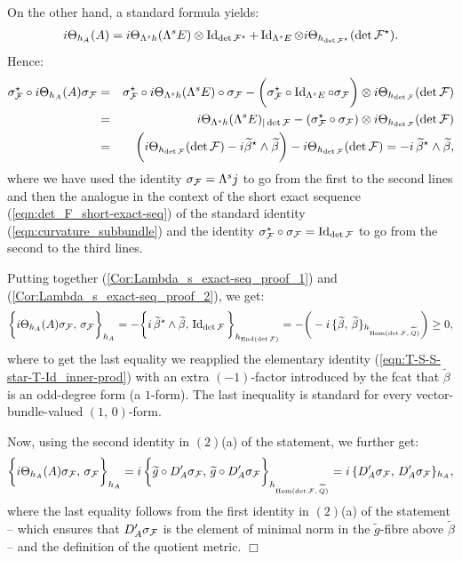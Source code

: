 \documentclass[12pt]{article}
\begin{document}
On the other hand, a standard formula yields: \begin{eqnarray*}i\Theta_{h_A}(A) = i\Theta_{\Lambda^sh}(\Lambda^sE)\otimes\operatorname{Id}_{\det{\cal F}^\star} + \operatorname{Id}_{\Lambda^sE}\otimes i\Theta_{h_{\det{\cal F}^\star}}(\det{\cal F}^\star).\end{eqnarray*} Hence: \begin{eqnarray}\label{Cor:Lambda_s_exact-seq_proof_2}\nonumber\sigma_{\cal F}^\star\circ i\Theta_{h_A}(A)\sigma_{\cal F} & = & \sigma_{\cal F}^\star\circ i\Theta_{\Lambda^sh}(\Lambda^sE)\circ\sigma_{\cal F} - \bigg(\sigma_{\cal F}^\star\circ\operatorname{Id}_{\Lambda^sE}\circ\sigma_{\cal F}\bigg)\otimes i\Theta_{h_{\det{\cal F}}}(\det{\cal F}) \\
\nonumber  & = & i\Theta_{\Lambda^sh}(\Lambda^sE)_{|\det{\cal F}} - (\sigma_{\cal F}^\star\circ\sigma_{\cal F})\otimes i\Theta_{h_{\det{\cal F}}}(\det{\cal F}) \\
& = & \bigg(i\Theta_{h_{\det{\cal F}}}(\det{\cal F}) - i\widetilde\beta^\star\wedge\widetilde\beta\bigg) - i\Theta_{h_{\det{\cal F}}}(\det{\cal F}) = - i\,\widetilde\beta^\star\wedge\widetilde\beta,\end{eqnarray} where we have used the identity $\sigma_{\cal F} = \Lambda^sj$ to go from the first to the second lines and then the analogue in the context of the short exact sequence (\ref{eqn:det_F_short-exact-seq}) of the standard identity (\ref{eqn:curvature_subbundle}) and the identity $\sigma_{\cal F}^\star\circ\sigma_{\cal F} = \operatorname{Id}_{\det\cal F}$ to go from the second to the third lines.

Putting together (\ref{Cor:Lambda_s_exact-seq_proof_1}) and (\ref{Cor:Lambda_s_exact-seq_proof_2}), we get: \begin{eqnarray*}\bigg\{i\Theta_{h_A}(A)\sigma_{\cal F},\,\sigma_{\cal F}\bigg\}_{h_A} = -\bigg\{i\,\widetilde\beta^\star\wedge\widetilde\beta,\,\operatorname{Id}_{\det{\cal F}}\bigg\}_{h_{\operatorname{End}(\det{\cal F})}} = -\bigg(-i\,\{\widetilde\beta,\,\widetilde\beta\}_{h_{\operatorname{Hom}(\det{\cal F},\,\widetilde{Q})}}\bigg)\geq 0,\end{eqnarray*} where to get the last equality we reapplied the elementary identity (\ref{eqn:T-S-S-star-T-Id_inner-prod}) with an extra $(-1)$-factor introduced by the fcat that $\widetilde\beta$ is an odd-degree form (a $1$-form). The last inequality is standard for every vector-bundle-valued $(1,\,0)$-form.

Now, using the second identity in $(2)$(a) of the statement, we further get: \begin{eqnarray*}\bigg\{i\Theta_{h_A}(A)\sigma_{\cal F},\,\sigma_{\cal F}\bigg\}_{h_A} = i\,\bigg\{\widetilde{g}\circ D_A'\sigma_{\cal F},\,\widetilde{g}\circ D_A'\sigma_{\cal F}\bigg\}_{h_{\operatorname{Hom}(\det{\cal F},\,\widetilde{Q})}} =  i\,\{D'_A\sigma_{\cal F},\,D'_A\sigma_{\cal F}\}_{h_A},\end{eqnarray*} where the last equality follows from the first identity in $(2)$(a) of the statement -- which ensures that $D'_A\sigma_{\cal F}$ is the element of minimal norm in the $\widetilde{g}$-fibre above $\widetilde\beta$ -- and the definition of the quotient metric.   \hfill $\Box$
\end{document}
